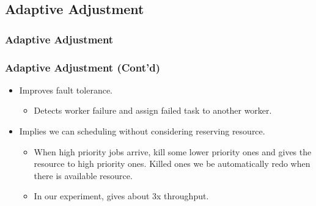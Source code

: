 \subsection{Adaptive Adjustment}
\begin{frame}
  \frametitle{Adaptive Adjustment}
\end{frame}
\begin{frame}
  \frametitle{Adaptive Adjustment (Cont'd)}
  \begin{itemize}
    \item Improves fault tolerance.
      \begin{itemize}
        \item Detects worker failure and assign failed task to another
          worker.
      \end{itemize}
    \item Implies we can scheduling without considering reserving resource.
      \begin{itemize}
        \item When high priority jobs arrive, kill some lower priority
          ones and gives the resource to high priority ones.  Killed
          ones we be automatically redo when there is available
          resource.
        \item In our experiment, gives about \alert{3x} throughput.
      \end{itemize}
  \end{itemize}
\end{frame}

